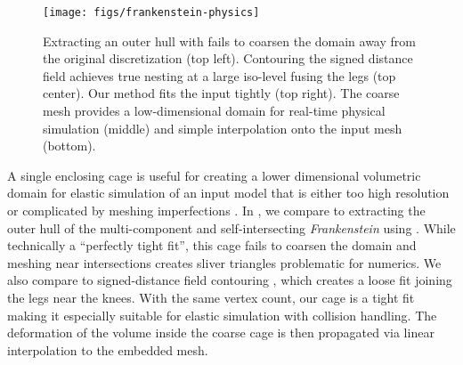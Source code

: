 \begin{figure}
  \texttt{[image: figs/frankenstein-physics]}
  \caption{Extracting an outer hull with \protect\cite{Jacobson:WN:2013} fails
  to coarsen the domain away from the original discretization (top left). Contouring
  the signed distance field \protect\cite{Xu:2014:SDF} achieves true nesting at
  a large iso-level fusing the legs (top center). Our method fits the input
  tightly (top right). The coarse mesh provides a low-dimensional domain for
  real-time physical simulation (middle) and simple interpolation onto the
  input mesh (bottom).}
  \label{fig:frankenstein-physics}
\end{figure}

A single enclosing cage is useful for creating a lower dimensional volumetric
domain for elastic simulation of an input model that is either too high
resolution or complicated by meshing imperfections \cite{Xu:2014:SDF}.
%
In , we compare to extracting the outer hull of
the multi-component and self-intersecting \emph{Frankenstein} using
\cite{Jacobson:WN:2013}.
%
While technically a ``perfectly tight fit'', this cage fails to coarsen the
domain and meshing near intersections creates sliver triangles problematic for
numerics.
%
We also compare to signed-distance field contouring \cite{Xu:2014:SDF}, which
creates a loose fit joining the legs near the knees.
%
With the same vertex count, our cage is a tight fit making it especially
suitable for elastic simulation with collision handling.
%
The deformation of the volume inside the coarse cage is then propagated via
linear interpolation to the embedded mesh.

